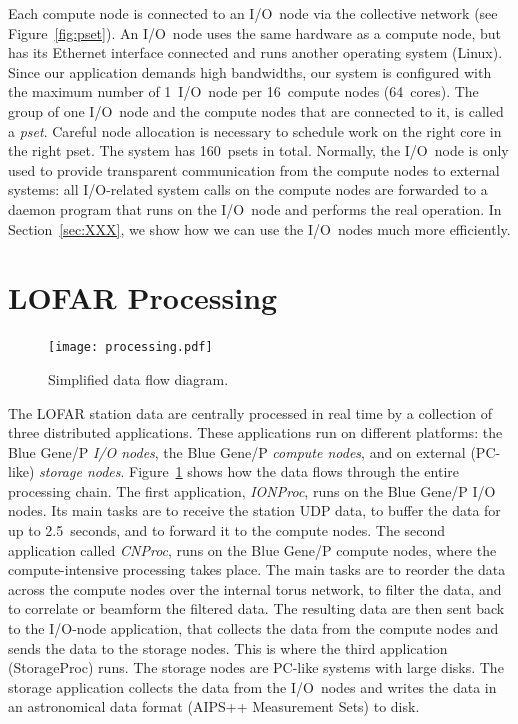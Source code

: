 \documentclass[conference]{IEEEtran}
\begin{document}
Each compute node is connected to an I/O~node via the collective network
(see Figure~\ref{fig:pset}).
An I/O~node uses the same hardware as a compute node, but has its Ethernet
interface connected and runs another operating system (Linux).
Since our application demands high bandwidths, our system is configured with
the maximum number of 1~I/O~node per 16~compute nodes (64~cores).
The group of one I/O~node and the compute nodes that are connected to it,
is called a \emph{pset}.
Careful node allocation is necessary to schedule work on the right core
in the right pset.
The system has 160~psets in total.
Normally, the I/O~node is only used to provide transparent communication
from the compute nodes to external systems: all I/O-related system calls
on the compute nodes are forwarded to a daemon program that runs on the
I/O~node and performs the real operation.
In Section~\ref{sec:XXX}, we show how we can use the I/O~nodes much more
efficiently.


\section{LOFAR Processing}

\begin{figure}
\texttt{[image: processing.pdf]}
\caption{Simplified data flow diagram.}
\label{fig:processing}
\end{figure}

The LOFAR station data are centrally processed in real time by a collection
of three distributed applications.
These applications run on different platforms:
the Blue Gene/P \emph{I/O nodes}, the Blue Gene/P \emph{compute nodes}, and on
external (PC-like) \emph{storage nodes}.
Figure~\ref{fig:processing} shows how the data flows through the entire
processing chain.
The first application, \emph{IONProc}, runs on the Blue Gene/P I/O nodes.
Its main tasks are to receive the station UDP data, to buffer the data
for up to 2.5~seconds, and to forward it to the compute nodes.
The second application called \emph{CNProc}, runs on the Blue Gene/P compute nodes, where the
compute-intensive processing takes place.
The main tasks are to reorder the data across the compute nodes over the
internal torus network, to filter the data, and to correlate or beamform
the filtered data.
The resulting data are then sent back to the I/O-node application, that
collects the data from the compute nodes and
sends the data to the storage nodes.
This is where the third application (StorageProc) runs.
The storage nodes are PC-like systems with large disks.
The storage application collects the data from the I/O~nodes and writes the
data in an astronomical data format (AIPS++ Measurement Sets) to disk.
\end{document}
